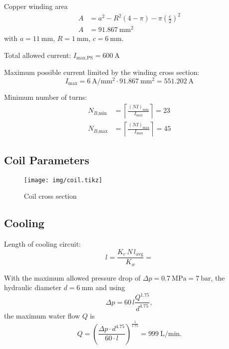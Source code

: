 \documentclass[10pt,a4paper,noendnumber=true]{scrartcl}
\begin{document}
Copper winding area
\begin{align}
A &= a^2- R^2 (4-\pi) - \pi \left(\frac{c}{2}\right)^2\\
A &= \SI{91.867}{\mm\squared}
\end{align}
with $a=\SI{11}{\mm}$, $R=\SI{1}{\mm}$, $c=\SI{6}{\mm}$.

Total allowed current: $I_\text{max,PS} = \SI{600}{\ampere}$

Maximum possible current limited by the winding cross section:
\begin{equation}
I_\text{max} = \SI{6}{\ampere\per\mm\squared} \cdot \SI{91.867}{\mm\squared} = \SI{551.202}{\ampere}
\end{equation}

Minimum number of turns:
\begin{align}
    N_{B\text{,min}} &= \left\lceil\frac{(NI)_\text{min}}{I_\text{max}}\right\rceil = 23\\
    N_{B\text{,max}} &= \left\lceil\frac{(NI)_\text{max}}{I_\text{max}}\right\rceil = 45
\end{align}

\subsection{Coil Parameters}
\begin{figure}[H]
\centering
\texttt{[image: img/coil.tikz]}
\caption{Coil cross section}
\end{figure}



\subsection{Cooling}
Length of cooling circuit:
\begin{equation}
    l = \frac{K_c\,N\,l_\text{avg}}{K_w} = 
\end{equation}


With the maximum allowed pressure drop of $\Delta p = \SI{0.7}{\mega\pascal} = \SI{7}{\bar}$, the hydraulic diameter $d=\SI{6}{\mm}$ and using
\begin{equation}
\Delta p = 60\,l\frac{Q^{1.75}}{d^{4.75}},
\end{equation}
the maximum water flow $Q$ is
\begin{equation}
    Q = \left(\frac{\Delta p \cdot d^{4.75}}{60\cdot l}\right)^\frac{1}{1.75} = \SI{999}{\liter\per\minute}.
\end{equation}
\end{document}
